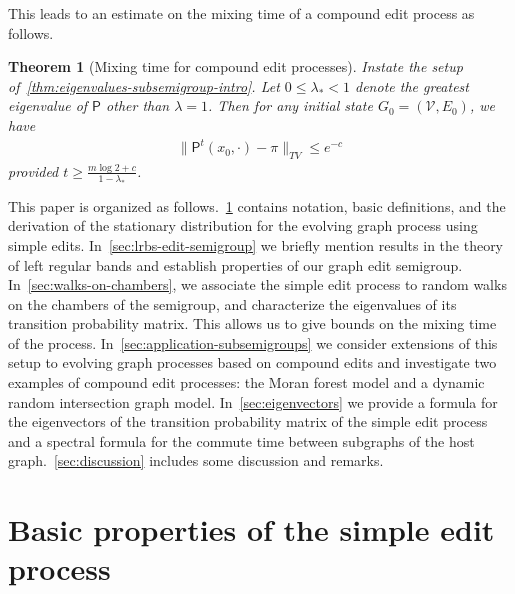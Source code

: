 \documentclass[11pt,a4paper]{article}
\newtheorem{theorem}{Theorem}[section]
\begin{document}
This leads to an estimate on the mixing time of a compound edit process as follows.

\begin{theorem}[Mixing time for compound edit processes]\label{thm:mixing-time-subsemigroup-intro}
    Instate the setup of~\cref{thm:eigenvalues-subsemigroup-intro}. Let $0\leq \lambda_\ast < 1$ denote the greatest eigenvalue of $\mathsf{P}$ other than $\lambda = 1$. Then for any initial state $G_0 = (\mathcal{V}, E_0)$, we have
        \begin{align}\label{eq:mixing-time-bound-compound}
            \|\mathsf{P}^t(x_0, \cdot) - \pi\|_{TV}\leq e^{-c}
        \end{align}
    provided $t\geq \frac{m\log{2} + c}{1-\lambda_\ast}$.
\end{theorem}

This paper is organized as follows.~\cref{sec:basic-properties} contains notation, basic definitions, and the derivation of the stationary distribution for the evolving graph process using simple edits. In~\cref{sec:lrbs-edit-semigroup} we briefly mention results in the theory of left regular bands and establish properties of our graph edit semigroup. In~\cref{sec:walks-on-chambers}, we associate the simple edit process to random walks on the chambers of the semigroup, and characterize the eigenvalues of its transition probability matrix. This allows us to give bounds on the mixing time of the process. In~\cref{sec:application-subsemigroups} we consider extensions of this setup to evolving graph processes based on compound edits and investigate two examples of compound edit processes: the Moran forest model and a dynamic random intersection graph model. In~\cref{sec:eigenvectors} we provide a formula for the eigenvectors of the transition probability matrix of the simple edit process and a spectral formula for the commute time between subgraphs of the host graph.~\cref{sec:discussion} includes some discussion and remarks.

\section{Basic properties of the simple edit process}\label{sec:basic-properties}

\end{document}
